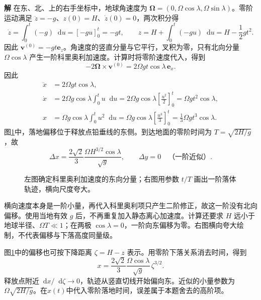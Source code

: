\documentclass[11pt,openany,fontset=fandol]{ctexbook}
\theoremstyle{definition}\newtheorem{example}{例}[chapter]\newtheorem{exercise}{习题}[chapter]
\newcommand{\SolutionStart}{\par\medskip\ifdim\pagetotal>0pt\ifdim\dimexpr\pagegoal-\pagetotal\relax<3\baselineskip\newpage\fi\fi\noindent\textbf{解}\quad\ignorespaces}
\newenvironment{solution}{\SolutionStart}{\par\medskip}
\newcommand{\dd}{\mathop{}\!\mathrm d}\newcommand{\ee}{\mathrm e}\newcommand{\vct}[1]{\bm{#1}}
\begin{document}
\begin{solution}
在东、北、上的右手坐标中，地球角速度为 $\vct\Omega=(0,\Omega\cos\lambda,\Omega\sin\lambda)$。零阶运动满足 $\ddot z=-g$、$z(0)=H$、$\dot z(0)=0$，两次积分得
\[
\dot z=\int_0^t(-g)\dd u=[-gu]_0^t=-gt,
\qquad
z=H+\int_0^t(-gu)\dd u=H-\frac12gt^2.
\]
因此 $\vct v^{(0)}=-gt\vct e_z$。角速度的竖直分量与它平行，叉积为零，只有北向分量 $\Omega\cos\lambda$ 产生一阶科里奥利加速度。计算时将零阶速度代入，得到
\[
-2\vct\Omega\times\vct v^{(0)}
=2\Omega g t\cos\lambda\,\vct e_x.
\]
因此
\[
\begin{aligned}
\ddot x&=2\Omega gt\cos\lambda,\\
\dot x&=2\Omega g\cos\lambda\int_0^t u\dd u
=2\Omega g\cos\lambda\left[\frac{u^2}{2}\right]_0^t
=\Omega gt^2\cos\lambda,\\
x&=\Omega g\cos\lambda\int_0^t u^2\dd u
=\Omega g\cos\lambda\left[\frac{u^3}{3}\right]_0^t
=\frac13\Omega gt^3\cos\lambda.
\end{aligned}
\]
图\ref{mp3:fig:l3-p11-s}中，落地偏移位于释放点铅垂线的东侧。到达地面的零阶时间为 $T=\sqrt{2H/g}$，故
\[
\Delta x=\frac{2\sqrt2}{3}
\frac{\Omega H^{3/2}\cos\lambda}{\sqrt g},\qquad
\Delta y=0\quad\text{（一阶近似）}.
\]

\begin{figure}[H]\centering
{}
\caption{左图确定科里奥利加速度的东向分量；右图用参数 $t/T$ 画出一阶落体轨迹，横向尺度夸大。}\label{mp3:fig:l3-p11-s}
\end{figure}


横向速度本身是一阶小量，再代入科里奥利项只产生二阶修正，故这一阶没有北向偏移。使用当地有效 $g$ 后，不再重复加入静态离心加速度。计算还要求 $H$ 远小于地球半径、$\Omega T\ll1$；在两极 $\cos\lambda=0$，一阶向东偏移为零。右图横向夸大绘制，不代表偏移与下落高度同量级。

图\ref{mp3:fig:l3-p11-s}中的偏移也可按下降距离 $\zeta=H-z$ 表示。用零阶下落关系消去时间，得到
\[
 x=\frac{2\sqrt2}{3}\frac{\Omega\cos\lambda}{\sqrt g}\,\zeta^{3/2}.
\]
释放点附近$\dd x/\dd\zeta\to0$，轨迹从竖直切线开始偏向东。近似的小量参数为$\Omega\sqrt{2H/g}$。在$x(t)$中代入零阶落地时间，误差属于本题舍去的高阶项。
\end{solution}
\end{document}
